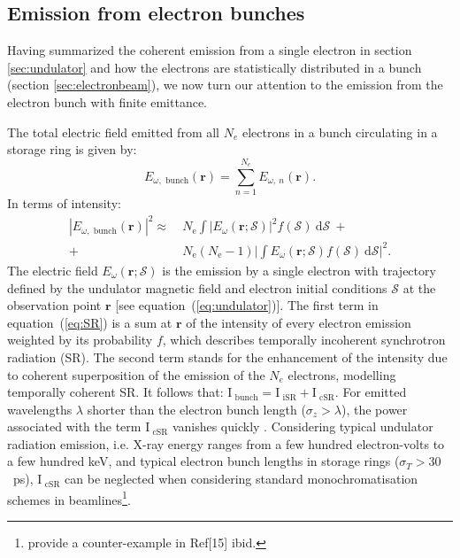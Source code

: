 \documentclass{iucr}              %
\begin{document}
\subsection{Emission from electron bunches}

Having summarized the coherent emission from a single electron in section \ref{sec:undulator} and how the electrons are statistically distributed in a bunch (section \ref{sec:electronbeam}), we now turn our attention to the emission from the electron bunch with finite emittance.

The total electric field emitted from all $N_e$ electrons in a bunch circulating in a storage ring is given by: 
\begin{equation}
    E_{\omega,\text{~bunch}}(\textbf{r}) = \sum_{n=1}^{N_e} E_{\omega,~n}(\textbf{r}).
\end{equation}
In terms of intensity: 
\begin{equation}
\begin{split}
|E_{\omega,\text{~bunch}}(\textbf{r})|^2 \approx ~&N_\text{e} \int\big| E_\omega(\textbf{r};\mathcal{S})\big|^2 f(\mathcal{S})~ \text{d}\mathcal{S}~+\\
+~ &N_\text{e}(N_\text{e}-1)\bigg| \int E_\omega(\textbf{r};\mathcal{S}) f(\mathcal{S})~ \text{d}\mathcal{S} \bigg|^2.
\end{split}
\label{eq:SR}
\end{equation}
The electric field $E_\omega(\textbf{r};\mathcal{S})$ is the emission by a single electron with trajectory defined by the undulator magnetic field and electron initial conditions $\mathcal{S}$
at the observation point $\textbf{r}$ [see equation~(\ref{eq:undulator})]. The first term in equation~(\ref{eq:SR}) is a sum at $\textbf{r}$ of the intensity of every electron emission weighted by its probability $f$, which describes temporally incoherent synchrotron radiation (SR). The second term stands for the enhancement of the intensity due to coherent superposition of the emission of the $N_e$ electrons, modelling temporally coherent SR. It follows that: $\text{I}_\text{~bunch} = \text{I}_\text{~iSR}+\text{I}_\text{~cSR}$.
For emitted wavelengths $\lambda$ shorter than the electron bunch length ($\sigma_z > \lambda$), the power associated with the term $\text{I}_\text{~cSR}$ vanishes quickly \cite{CSR,Wiedemann2015}. Considering typical undulator radiation emission, i.e. X-ray energy ranges from a few hundred electron-volts to a few hundred keV, and typical electron bunch lengths in storage rings ($\sigma_{T}>30$~ps), $\text{I}_\text{~cSR}$ can be neglected when considering standard monochromatisation schemes in beamlines\footnote{ provide a counter-example in Ref[15] ibid.}.
\end{document}

